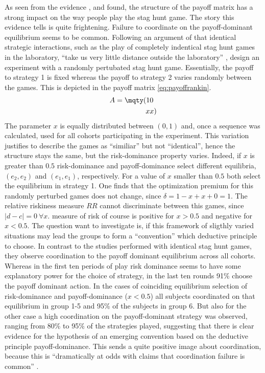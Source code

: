 As seen from the evidence \textcite{battalio_optimization_2001},
\textcite{schmidt_playing_2003} and \textcite{dubois_optimization_2012} 
found, the structure of the payoff matrix has a strong impact on the way 
people play the stag hunt game.   
The story this evidence tells is quite frightening. Failure to coordinate 
on the payoff-dominant equilibrium seems to be common. 
Following an argument of \textcite{kreps_game_1990} that identical strategic 
interactions, such as the play of completely indentical stag hunt games 
in the laboratory, ``take us very little distance outside the laboratory'' 
\parencite[212]{kreps_game_1990}, 
\textcite{rankin_strategic_2000} design an experiment with a randomly 
pertubated stag hunt game. Essentially, the payoff to strategy 1 is fixed 
whereas the payoff to strategy 2 varies randomly between the games. This is
depicted in the payoff matrix \eqref{eq:payoffrankin}.
\begin{align}
        \label{eq:payoffrankin}
        A = \mqty(1 & 0 \\ x & x)
\end{align}        
The parameter $x$ is equally distributed between $(0,1)$ and, once a sequence
was calculated, used for all cohorts participating in the experiment. This
variation justifies to describe the games as ``similiar'' but not
``identical'', hence the structure stays the same, but the risk-dominance 
property varies. Indeed, if $x$ is greater than $0.5$ risk-dominance and
payoff-dominance select different equilibria, $(e_2,e_2)$ and $(e_1,e_1)$,
respectively. For a value of $x$ smaller than $0.5$ both select 
the equilibrium in strategy 1. One finds that the optimization premium for 
this randomly perturbed games does not change, since $\delta=1-x+x+0=1$. 
The relative riskiness measure $RR$ cannot discriminate between this games,
since $|d-c|=0\ \forall x$. \textcite{schmidt_playing_2003} measure of risk of 
course is positive for $x > 0.5$ and negative for $x <0.5$. 
The question \textcite{rankin_strategic_2000}
want to investigate is, if this framework of sligthly varied situations may
lead the groups to form a ``convention'' which deductive principle to choose. 
In contrast to the studies performed with identical stag hunt games, they 
observe coordination to the payoff dominant equilibrium across
all cohorts. Whereas in the first ten periods of play risk dominance seems
to have some explanatory power for the choice of strategy, in the last ten
rounds 91\% choose the payoff dominant action. 
In the cases of coinciding equilibrium selection of risk-dominance and 
payoff-dominance ($x < 0.5$) all subjects coordinated on that equilibrium in 
group 1-5 and 95\% of the subjects in group 6. But also for the other case a 
high coordination on the payoff-dominant strategy was observed, ranging from 
80\% to 95\% of the strategies played, suggesting that there is clear evidence
for the hypothesis of an emerging convention based on the deductive principle
payoff-dominance. This sends a quite positive image about coordination, because 
this is ``dramatically at odds with claims that coordination failure is common''
\parencite[9]{devetag_when_2007}. 

